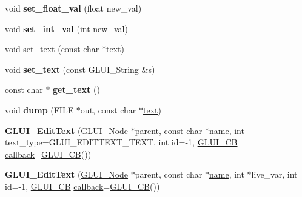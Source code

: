 \begin{DoxyCompactItemize}
\item 
\hypertarget{classGLUI__EditText_a2c0caddce6e11b8a303c8f247b8fbf0f}{void {\bfseries set\-\_\-float\-\_\-val} (float new\-\_\-val)}\label{classGLUI__EditText_a2c0caddce6e11b8a303c8f247b8fbf0f}

\item 
\hypertarget{classGLUI__EditText_a230980562d1c49166c7600f1771669bd}{void {\bfseries set\-\_\-int\-\_\-val} (int new\-\_\-val)}\label{classGLUI__EditText_a230980562d1c49166c7600f1771669bd}

\item 
void \hyperlink{classGLUI__EditText_aa283908f42990f6056298d6381cc19a7}{set\-\_\-text} (const char $\ast$\hyperlink{classGLUI__Control_af0d60e9736f4dbc34e9a536e75876d72}{text})
\item 
\hypertarget{classGLUI__EditText_a0f60b8b2a59ecf51b145187483b8deb2}{void {\bfseries set\-\_\-text} (const G\-L\-U\-I\-\_\-\-String \&s)}\label{classGLUI__EditText_a0f60b8b2a59ecf51b145187483b8deb2}

\item 
\hypertarget{classGLUI__EditText_a621ba269343beeba0346439a43e5e355}{const char $\ast$ {\bfseries get\-\_\-text} ()}\label{classGLUI__EditText_a621ba269343beeba0346439a43e5e355}

\item 
\hypertarget{classGLUI__EditText_a8c553db0ecb0814a3db0da5bcf630d58}{void {\bfseries dump} (F\-I\-L\-E $\ast$out, const char $\ast$\hyperlink{classGLUI__Control_af0d60e9736f4dbc34e9a536e75876d72}{text})}\label{classGLUI__EditText_a8c553db0ecb0814a3db0da5bcf630d58}

\item 
\hypertarget{classGLUI__EditText_af99784896490989539ef7638a7fd4e12}{{\bfseries G\-L\-U\-I\-\_\-\-Edit\-Text} (\hyperlink{classGLUI__Node}{G\-L\-U\-I\-\_\-\-Node} $\ast$parent, const char $\ast$\hyperlink{classGLUI__Control_aa95b97d50df45335fc33f0af03958eb3}{name}, int text\-\_\-type=G\-L\-U\-I\-\_\-\-E\-D\-I\-T\-T\-E\-X\-T\-\_\-\-T\-E\-X\-T, int id=-\/1, \hyperlink{classGLUI__CB}{G\-L\-U\-I\-\_\-\-C\-B} \hyperlink{classGLUI__Control_a96060fe0cc6d537e736dd6eef78e24ab}{callback}=\hyperlink{classGLUI__CB}{G\-L\-U\-I\-\_\-\-C\-B}())}\label{classGLUI__EditText_af99784896490989539ef7638a7fd4e12}

\item 
\hypertarget{classGLUI__EditText_acde777046eb65672c70c51b5728e7c3f}{{\bfseries G\-L\-U\-I\-\_\-\-Edit\-Text} (\hyperlink{classGLUI__Node}{G\-L\-U\-I\-\_\-\-Node} $\ast$parent, const char $\ast$\hyperlink{classGLUI__Control_aa95b97d50df45335fc33f0af03958eb3}{name}, int $\ast$live\-\_\-var, int id=-\/1, \hyperlink{classGLUI__CB}{G\-L\-U\-I\-\_\-\-C\-B} \hyperlink{classGLUI__Control_a96060fe0cc6d537e736dd6eef78e24ab}{callback}=\hyperlink{classGLUI__CB}{G\-L\-U\-I\-\_\-\-C\-B}())}\label{classGLUI__EditText_acde777046eb65672c70c51b5728e7c3f}


\end{DoxyCompactItemize}
